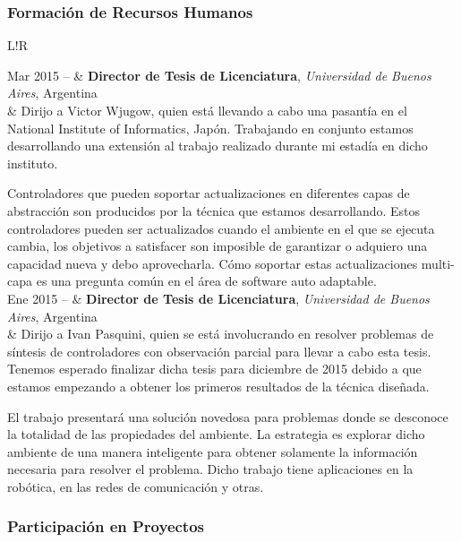 \documentclass[10pt]{article}
\newcommand\VRule{\color{lightgray}\vrule width 0.5pt}
\begin{document}
\subsubsection*{Formación de Recursos Humanos}

\begin{tabular}{L!{\VRule}R}
	
	Mar 2015 -- & \textbf{Director de Tesis de Licenciatura}, 
	\textit{Universidad de Buenos Aires}, Argentina\\
	& Dirijo a Victor Wjugow, quien está llevando a cabo una pasantía en el 
	National Institute of Informatics, Japón. Trabajando
	en conjunto estamos desarrollando una extensión al trabajo realizado 
	durante mi estadía en dicho instituto.
	
	Controladores que pueden soportar actualizaciones en diferentes capas de 
	abstracción son producidos por la técnica que
	estamos desarrollando. Estos controladores pueden ser actualizados cuando 
	el ambiente en el que se ejecuta cambia,
	los objetivos a satisfacer son imposible de garantizar o adquiero una 
	capacidad nueva y debo aprovecharla. Cómo
	soportar estas actualizaciones multi-capa es una pregunta común en el área 
	de software auto adaptable.\\
	
	Ene 2015 -- & \textbf{Director de Tesis de Licenciatura}, 
	\textit{Universidad de Buenos Aires}, Argentina\\
	& Dirijo a Ivan Pasquini, quien se está involucrando en resolver problemas 
	de síntesis de controladores con
	observación parcial para llevar a cabo esta tesis. Tenemos esperado 
	finalizar dicha tesis para diciembre de 2015 debido
	a que estamos empezando a obtener los primeros resultados de la técnica 
	diseñada.
	
	El trabajo presentará una solución novedosa para problemas donde se 
	desconoce la totalidad de las propiedades del
	ambiente. La estrategia es explorar dicho ambiente de una manera 
	inteligente para obtener solamente la información
	necesaria para resolver el problema. Dicho trabajo tiene aplicaciones en la 
	robótica, en las redes de comunicación y
	otras.\\
	
	
\end{tabular}


\subsubsection*{Participación en Proyectos}
\end{document}

